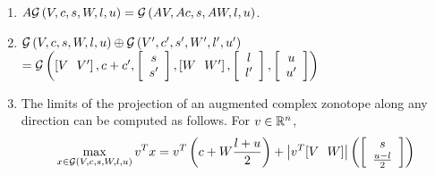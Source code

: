 \begin{enumerate}
\item $A\mathcal{G}\left(V,c,s,W,l,u\right) = \mathcal{G}\left(AV,Ac,s,AW,l,u\right)$.
\item $\mathcal{G}\left(V,c,s,W,l,u\right)\oplus
  \mathcal{G}\left(V^\prime,c^\prime,s^\prime,W^\prime,l^\prime,u^\prime\right)$\\
$= \mathcal{G}\left(\left[V~~V^\prime\right],c+c^\prime,\left[\begin{array}{c}{s}\\{s^\prime} \end{array}\right],\left[W~~W^\prime\right],\left[\begin{array}{c}{l}\\{l^\prime} \end{array}\right],\left[\begin{array}{c}{u}\\{u^\prime} \end{array}\right]\right)$

%
\item The limits of the projection of an augmented complex zonotope along
any direction can be computed as follows. For $v\in\mathbb{R}^n$,
\begin{equation}\label{lem:polylimits-acz}
\max_{x\in\mathcal{G}\left(V,c,s,W,l,u\right)}v^Tx = v^T\left(c+W\frac{l+u}{2}\right)+\left|v^T[V~~W]\right|\left(\left[\begin{array}{c}{s}\\{\frac{u-l}{2}} \end{array}\right]\right)
\end{equation}
\end{enumerate}
%


